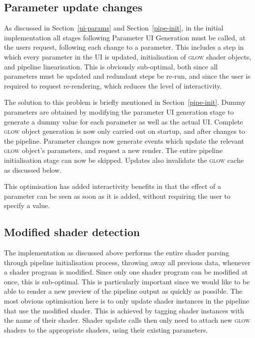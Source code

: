 \documentclass[12pt,twoside,notitlepage]{report}
\begin{document}
\subsection{Parameter update changes}
As discussed in Section~\ref{ui-params} and Section~\ref{pipe-init}, in the initial implementation all stages following Parameter UI Generation must be called, at the users request, following each change to a parameter. This includes a step in which every parameter in the UI is updated, initialisation of \textsc{glow} shader objects, and pipeline linearisation. This is obviously sub-optimal, both since all parameters must be updated and redundant steps be re-run, and since the user is required to request re-rendering, which reduces the level of interactivity.

The solution to this problem is briefly mentioned in Section~\ref{pipe-init}. Dummy parameters are obtained by modifying the parameter UI generation stage to generate a dummy value for each parameter as well as the actual UI. Complete \textsc{glow} object generation is now only carried out on startup, and after changes to the pipeline. Parameter changes now generate events which update the relevant \textsc{glow} object's parameters, and request a new render. The entire pipeline initialisation stage can now be skipped. Updates also invalidate the \textsc{glow} cache as discussed below.

This optimisation has added interactivity benefits in that the effect of a parameter can be seen as soon as it is added, without requiring the user to specify a value.

\subsection{Modified shader detection}
\label{msd}
The implementation as discussed above performs the entire shader parsing through pipeline initialisation process, throwing away all previous data, whenever a shader program is modified. Since only one shader program can be modified at once, this is sub-optimal. This is particularly important since we would like to be able to render a new preview of the pipeline output as quickly as possible. The most obvious optimisation here is to only update shader instances in the pipeline that use the modified shader. This is achieved by tagging shader instances with the name of their shader. Shader update calls then only need to attach new \textsc{glow} shaders to the appropriate shaders, using their existing parameters.
\end{document}
